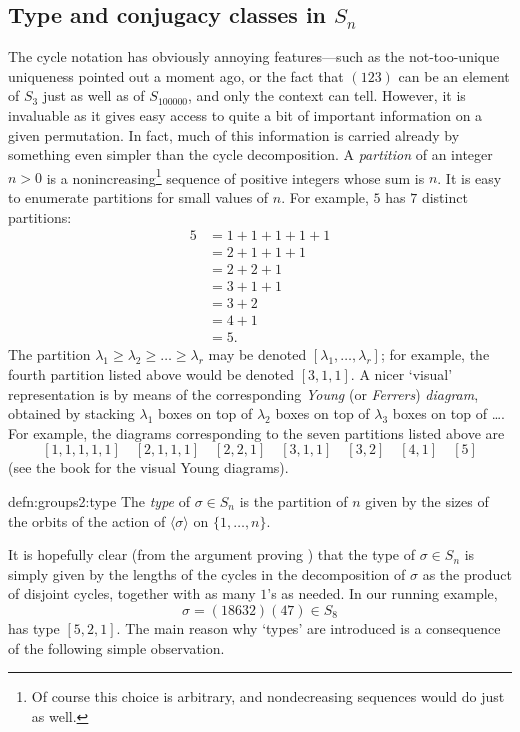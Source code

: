 \subsection{Type and conjugacy classes in \texorpdfstring{$S_n$}{Sn}}
\label{subsec:groups2:type-conjugacy-sn}
The cycle notation has obviously annoying features---such as the
not-too-unique uniqueness pointed out a moment ago, or the fact that
$(123)$ can be an element of $S_3$ just as well as of $S_{100000}$,
and only the context can tell. However, it is invaluable as it gives
easy access to quite a bit of important information on a given
permutation. In fact, much of this information is carried already by
something even simpler than the cycle decomposition.  A
\emph{partition} of an integer $n > 0$ is a nonincreasing\footnote{Of
  course this choice is arbitrary, and nondecreasing sequences would
  do just as well.} sequence of positive integers whose sum is $n$. It
is easy to enumerate partitions for small values of $n$. For example,
$5$ has $7$ distinct partitions:
\begin{align*}
  5 &= 1 + 1 + 1 + 1 + 1\\
    &= 2 + 1 + 1 + 1\\
    &= 2 + 2 + 1\\
    &= 3 + 1 + 1\\
    &= 3 + 2\\
    &= 4 + 1\\
    &= 5.
\end{align*}
The partition $\lambda_1 \geq \lambda_2 \geq \dots \geq \lambda_r$ may
be denoted $[\lambda_1, \dots, \lambda_r]$; for example, the fourth
partition listed above would be denoted $[3, 1, 1]$. A nicer `visual'
representation is by means of the corresponding \emph{Young} (or
\emph{Ferrers}) \emph{diagram}, obtained by stacking $\lambda_1$ boxes
on top of $\lambda_2$ boxes on top of $\lambda_3$ boxes on top of
\dots. For example, the diagrams corresponding to the seven partitions
listed above are
\[ [1,1,1,1,1] \quad [2,1,1,1] \quad [2,2,1] \quad [3,1,1] \quad [3,2]
  \quad [4,1] \quad [5]
\]
(see the book for the visual Young diagrams).
\begin{defn}{}{defn:groups2:type}
  The \emph{type} of $\sigma \in S_n$ is the partition of $n$ given by
  the sizes of the orbits of the action of $\langle\sigma\rangle$ on
  $\{1,\dots,n\}$.
\end{defn}

It is hopefully clear (from the argument proving
) that the type of
$\sigma \in S_n$ is simply given by the lengths of the cycles in the
decomposition of $\sigma$ as the product of disjoint cycles, together
with as many $1$'s as needed. In our running example,
\[
  \sigma = (18632)(47) \in S_8
\]
has type $[5, 2, 1]$.  The main reason why `types' are introduced is a
consequence of the following simple observation.

